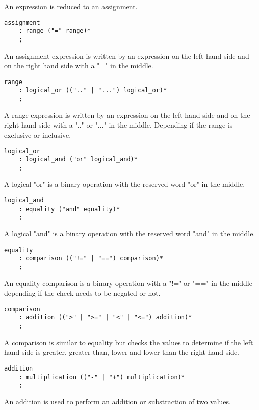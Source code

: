 An expression is reduced to an assignment.

\begin{lstlisting}
assignment
    : range ("=" range)*
    ;
\end{lstlisting}

An assignment expression is written by an expression on the left hand side and on the right hand side with a "=" in the middle.

\begin{lstlisting}
range
    : logical_or ((".." | "...") logical_or)*
    ;
\end{lstlisting}

A range expression is written by an expression on the left hand side and on the right hand side with a ".." or "..." in the middle. Depending
if the range is exclusive or inclusive.

\begin{lstlisting}
logical_or
    : logical_and ("or" logical_and)*
    ;
\end{lstlisting}

A logical "or" is a binary operation with the reserved word "or" in the middle.

\begin{lstlisting}
logical_and
    : equality ("and" equality)*
    ;
\end{lstlisting}

A logical "and" is a binary operation with the reserved word "and" in the middle.

\begin{lstlisting}
equality
    : comparison (("!=" | "==") comparison)*
    ;
\end{lstlisting}

An equality comparison is a binary operation with a "!=" or "==" in the middle depending if the check needs to be negated or not.

\begin{lstlisting}
comparison
    : addition ((">" | ">=" | "<" | "<=") addition)*
    ;
\end{lstlisting}

A comparison is similar to equality but checks the values to determine if the left hand side is greater, greater than, lower and lower than the
right hand side.

\begin{lstlisting}
addition
    : multiplication (("-" | "+") multiplication)*
    ;
\end{lstlisting}

An addition is used to perform an addition or substraction of two values.

